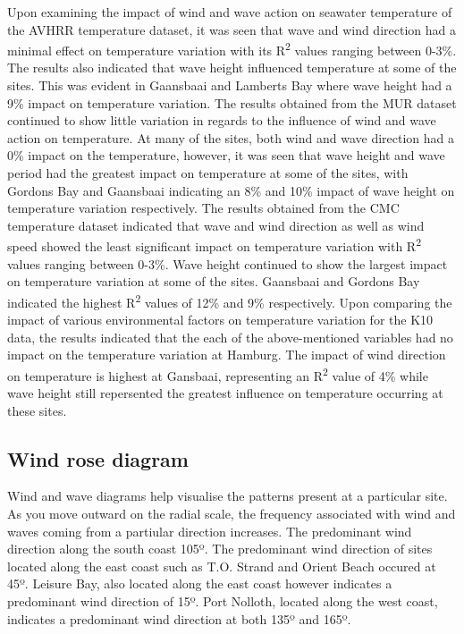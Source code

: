 \documentclass[12pt,A4paper,]{article}
\begin{document}
Upon examining the impact of wind and wave action on seawater
temperature of the AVHRR temperature dataset, it was seen that wave and
wind direction had a minimal effect on temperature variation with its
R\textsuperscript{2} values ranging between 0-3\%. The results also
indicated that wave height influenced temperature at some of the sites.
This was evident in Gaansbaai and Lamberts Bay where wave height had a
9\% impact on temperature variation. The results obtained from the MUR
dataset continued to show little variation in regards to the influence
of wind and wave action on temperature. At many of the sites, both wind
and wave direction had a 0\% impact on the temperature, however, it was
seen that wave height and wave period had the greatest impact on
temperature at some of the sites, with Gordons Bay and Gaansbaai
indicating an 8\% and 10\% impact of wave height on temperature
variation respectively. The results obtained from the CMC temperature
dataset indicated that wave and wind direction as well as wind speed
showed the least significant impact on temperature variation with
R\textsuperscript{2} values ranging between 0-3\%. Wave height continued
to show the largest impact on temperature variation at some of the
sites. Gaansbaai and Gordons Bay indicated the highest
R\textsuperscript{2} values of 12\% and 9\% respectively. Upon comparing
the impact of various environmental factors on temperature variation for
the K10 data, the results indicated that the each of the above-mentioned
variables had no impact on the temperature variation at Hamburg. The
impact of wind direction on temperature is highest at Gansbaai,
representing an R\textsuperscript{2} value of 4\% while wave height
still repersented the greatest influence on temperature occurring at
these sites.

\subsection{Wind rose diagram}\label{wind-rose-diagram}

Wind and wave diagrams help visualise the patterns present at a
particular site. As you move outward on the radial scale, the frequency
associated with wind and waves coming from a partiular direction
increases. The predominant wind direction along the south coast 105º.
The predominant wind direction of sites located along the east coast
such as T.O. Strand and Orient Beach occured at 45º. Leisure Bay, also
located along the east coast however indicates a predominant wind
direction of 15º. Port Nolloth, located along the west coast, indicates
a predominant wind direction at both 135º and 165º.
\end{document}
